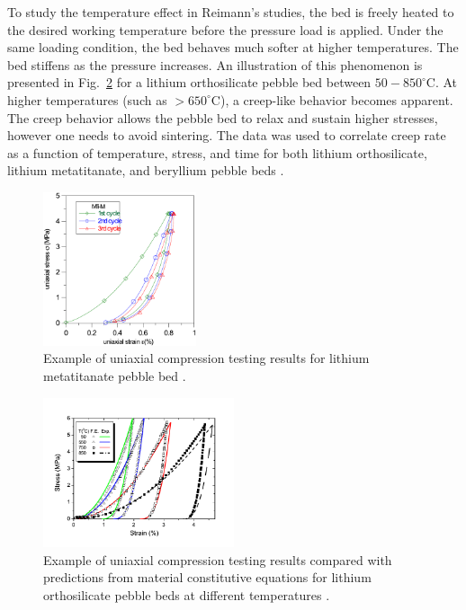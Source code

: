 To study the temperature effect in Reimann's studies, the bed is freely heated to the desired working temperature before the pressure load is applied. Under the same loading condition, the bed behaves much softer at higher temperatures. The bed stiffens as the pressure increases. An illustration of this phenomenon is presented in Fig.~\ref{fig:UCT} for a lithium orthosilicate pebble bed between $50-850^\circ$C. At higher temperatures (such as $> 650^\circ$C), a creep-like behavior becomes apparent. The creep behavior allows the pebble bed to relax and sustain higher stresses, however one needs to avoid sintering. The data was used to correlate creep rate as a function of temperature, stress, and time for both lithium orthosilicate, lithium metatitanate, and beryllium pebble beds \cite{Buhler:2002qf,Reimann:2001il,Reimann:2005qa}.


\begin{figure}[t!]
\begin{center}
\includegraphics[width=0.4\textwidth]{chapters/figures/Fig-1}
\caption{Example of uniaxial compression testing results for lithium metatitanate pebble bed \cite{vanderlaan2011}.}
\label{fig:mti}
\end{center}
\end{figure}

\begin{figure}[t!]
\begin{center}
\includegraphics[width=0.5\textwidth]{chapters/figures/Fig-2}
\caption{Example of uniaxial compression testing results compared with predictions from material constitutive equations for lithium orthosilicate pebble beds at different temperatures \cite{Gan:2008kx}.}
\label{fig:UCT}
\end{center}
\end{figure}

